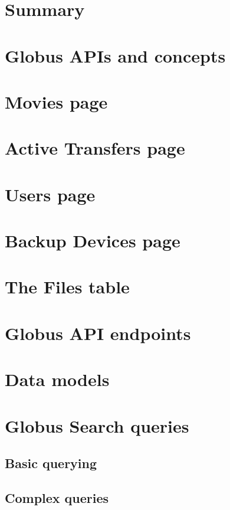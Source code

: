 \documentclass{report}
\begin{document}
\maketitle
\tableofcontents

\chapter{Summary}


\chapter{Globus APIs and concepts}


\chapter{Movies page}


\chapter{Active Transfers page}


\chapter{Users page}


\chapter{Backup Devices page}


\appendix

\chapter{The Files table}

\chapter{Globus API endpoints\label{appendix:globusapis}}


\chapter{Data models}


\chapter{Globus Search queries}
\section{Basic querying}
\section{Complex queries}
\end{document}
